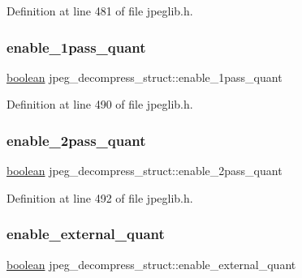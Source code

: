 Definition at line 481 of file jpeglib.\+h.

\mbox{\label{structjpeg__decompress__struct_a9a879ce46d9ec6463367f88f8bc27785}} 
\subsubsection{\texorpdfstring{enable\_1pass\_quant}{enable\_1pass\_quant}}
{\footnotesize\ttfamily \mbox{\hyperlink{jmorecfg_8h_a7c6368b321bd9acd0149b030bb8275ed}{boolean}} jpeg\+\_\+decompress\+\_\+struct\+::enable\+\_\+1pass\+\_\+quant}



Definition at line 490 of file jpeglib.\+h.

\mbox{\label{structjpeg__decompress__struct_a93a36ee821e6ddc5cddcde0067e5c566}} 
\subsubsection{\texorpdfstring{enable\_2pass\_quant}{enable\_2pass\_quant}}
{\footnotesize\ttfamily \mbox{\hyperlink{jmorecfg_8h_a7c6368b321bd9acd0149b030bb8275ed}{boolean}} jpeg\+\_\+decompress\+\_\+struct\+::enable\+\_\+2pass\+\_\+quant}



Definition at line 492 of file jpeglib.\+h.

\mbox{\label{structjpeg__decompress__struct_aac4a69c22e40b580f6890639a4f656a3}} 
\subsubsection{\texorpdfstring{enable\_external\_quant}{enable\_external\_quant}}
{\footnotesize\ttfamily \mbox{\hyperlink{jmorecfg_8h_a7c6368b321bd9acd0149b030bb8275ed}{boolean}} jpeg\+\_\+decompress\+\_\+struct\+::enable\+\_\+external\+\_\+quant}



